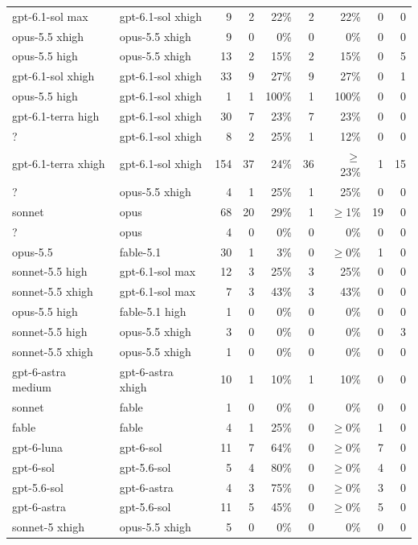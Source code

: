 \documentclass[11pt,a4paper]{article}
\begin{document}
{\begin{longtable}{@{}llrrrrrrr@{}}
gpt-6.1-sol max & gpt-6.1-sol xhigh & 9 & 2 & 22\% & 2 & 22\% & 0 & 0 \\
opus-5.5 xhigh & opus-5.5 xhigh & 9 & 0 & 0\% & 0 & 0\% & 0 & 0 \\
opus-5.5 high & opus-5.5 xhigh & 13 & 2 & 15\% & 2 & 15\% & 0 & 5 \\
gpt-6.1-sol xhigh & gpt-6.1-sol xhigh & 33 & 9 & 27\% & 9 & 27\% & 0 & 1 \\
opus-5.5 high & gpt-6.1-sol xhigh & 1 & 1 & 100\% & 1 & 100\% & 0 & 0 \\
gpt-6.1-terra high & gpt-6.1-sol xhigh & 30 & 7 & 23\% & 7 & 23\% & 0 & 0 \\
? & gpt-6.1-sol xhigh & 8 & 2 & 25\% & 1 & 12\% & 0 & 0 \\
gpt-6.1-terra xhigh & gpt-6.1-sol xhigh & 154 & 37 & 24\% & 36 & $\geq$23\% & 1 & 15 \\
? & opus-5.5 xhigh & 4 & 1 & 25\% & 1 & 25\% & 0 & 0 \\
sonnet & opus & 68 & 20 & 29\% & 1 & $\geq$1\% & 19 & 0 \\
? & opus & 4 & 0 & 0\% & 0 & 0\% & 0 & 0 \\
opus-5.5 & fable-5.1 & 30 & 1 & 3\% & 0 & $\geq$0\% & 1 & 0 \\
sonnet-5.5 high & gpt-6.1-sol max & 12 & 3 & 25\% & 3 & 25\% & 0 & 0 \\
sonnet-5.5 xhigh & gpt-6.1-sol max & 7 & 3 & 43\% & 3 & 43\% & 0 & 0 \\
opus-5.5 high & fable-5.1 high & 1 & 0 & 0\% & 0 & 0\% & 0 & 0 \\
sonnet-5.5 high & opus-5.5 xhigh & 3 & 0 & 0\% & 0 & 0\% & 0 & 3 \\
sonnet-5.5 xhigh & opus-5.5 xhigh & 1 & 0 & 0\% & 0 & 0\% & 0 & 0 \\
gpt-6-astra medium & gpt-6-astra xhigh & 10 & 1 & 10\% & 1 & 10\% & 0 & 0 \\
sonnet & fable & 1 & 0 & 0\% & 0 & 0\% & 0 & 0 \\
fable & fable & 4 & 1 & 25\% & 0 & $\geq$0\% & 1 & 0 \\
gpt-6-luna & gpt-6-sol & 11 & 7 & 64\% & 0 & $\geq$0\% & 7 & 0 \\
gpt-6-sol & gpt-5.6-sol & 5 & 4 & 80\% & 0 & $\geq$0\% & 4 & 0 \\
gpt-5.6-sol & gpt-6-astra & 4 & 3 & 75\% & 0 & $\geq$0\% & 3 & 0 \\
gpt-6-astra & gpt-5.6-sol & 11 & 5 & 45\% & 0 & $\geq$0\% & 5 & 0 \\
sonnet-5 xhigh & opus-5.5 xhigh & 5 & 0 & 0\% & 0 & 0\% & 0 & 0 \\

\end{longtable}}
\end{document}
